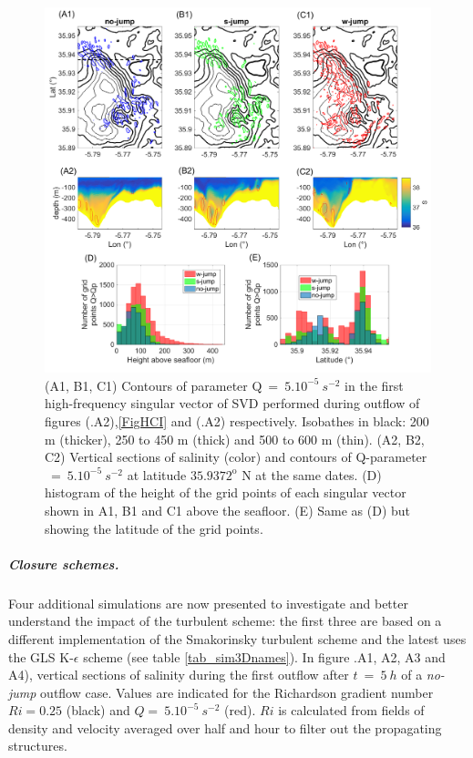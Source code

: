 \begin{figure}[!h]
 \includegraphics[width=\textwidth]{./GBR3D/EOF5_MIV_2D.png}
 \caption {(A1, B1, C1) Contours of parameter Q$\ =\ 5.10^{-5} \ s^{-2}$ in the first high-frequency singular vector of SVD performed during outflow of figures (.A2),\ref{FigHCI} and (.A2) respectively. Isobathes in black: 200 m (thicker), 250 to 450 m (thick) and 500 to 600 m (thin). (A2, B2, C2) Vertical sections of salinity (color) and contours of Q-parameter $\ =\ 5.10^{-5}\ s^{-2}$ at latitude $35.9372^\text{o}$ N at the same dates. (D) histogram of the height of the grid points of each singular vector shown in A1, B1 and C1 above the seafloor. (E) Same as (D) but showing the latitude of the grid points.}
 \label{FigEOFMIV}
\end{figure}

\subparagraph{Closure schemes.}

Four additional simulations are now presented to investigate and better understand the impact of the turbulent scheme: the first three are based on a different implementation of the Smakorinsky turbulent scheme and the latest uses the GLS K-$\epsilon$ scheme (see table \ref{tab_sim3Dnames}). 
In figure .A1, A2, A3 and A4), vertical sections of salinity during the first outflow after $t\ =\ 5\ h$ of a \textit{no-jump} outflow case. Values are indicated for the Richardson gradient number $Ri=0.25$ (black) and $Q =\ 5.10^{-5} \ s^{-2}$ (red). $Ri$ is calculated from fields of density and velocity averaged over half and hour to filter out the propagating structures.

